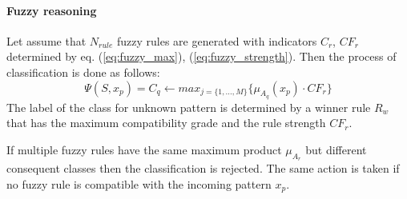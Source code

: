 \paragraph{Fuzzy reasoning}
\label{cha:Fuzzy_reasoning}
Let assume that $N_{rule}$ fuzzy rules are generated with indicators $C_r$,
$CF_r$ determined by eq. (\ref{eq:fuzzy_max}), (\ref{eq:fuzzy_strength}). 
Then the process of classification is done as follows:
\begin{equation}
    \Psi(S, x_p) =  C_q \leftarrow max_{j=\{1,\ldots,
    M\}}\{\mu_{A_{q}}(x_p)\cdot CF_r\}
    \label{eq:fuzzy_classification}
\end{equation}
The label of the class for unknown pattern is determined by a winner rule $R_w$
that has the maximum compatibility grade and the rule strength $CF_r$.

If multiple fuzzy rules have the same maximum product $\mu_{A_r}$ but different
consequent classes then the classification is rejected. The same action is
taken if no fuzzy rule is compatible with the incoming pattern $x_p$.

